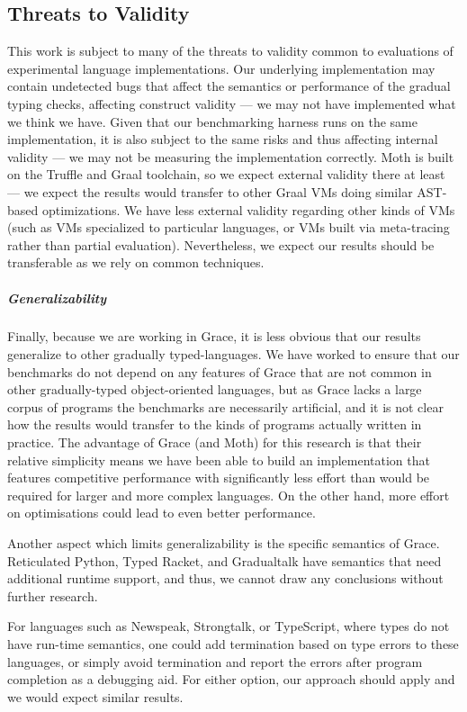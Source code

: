 \subsection{Threats to Validity}


This work is subject to many of the threats to validity common to
evaluations of experimental language implementations.  Our underlying
implementation may contain undetected bugs that affect the semantics
or performance of the gradual typing checks, affecting construct
validity --- we may not have implemented what we think we have. Given
that our benchmarking harness runs on the same implementation, it is also
subject to the same risks and thus affecting internal validity ---
we may not be measuring the implementation correctly.  Moth is built
on the Truffle and Graal toolchain, so we expect external validity
there at least --- we expect the results would transfer to other Graal
VMs doing similar AST-based optimizations.  We have less external
validity regarding other kinds of VMs (such as VMs specialized to 
particular languages, or VMs built via meta-tracing rather than partial evaluation). 
Nevertheless, we expect our results should be transferable
as we rely on common techniques.


\subparagraph{Generalizability}
Finally, because we are working in Grace, it is less obvious that our
results generalize to other gradually typed-languages. We have worked
to ensure that \eg our benchmarks do not depend on any features of Grace
that are not common in other gradually-typed object-oriented
languages, but as Grace lacks a large corpus of programs the
benchmarks are necessarily artificial, and it is not clear how the
results would transfer to the kinds of programs actually written in
practice. The advantage of Grace (and Moth) for this research is
that their relative simplicity means we have been able to build an
implementation that features competitive performance with significantly less
effort than would be required for larger and more complex languages.
On the other hand, more effort on optimisations could lead to
even better performance.

Another aspect which limits generalizability is the specific semantics of Grace.
Reticulated Python, Typed Racket, and Gradualtalk have semantics that need
additional runtime support, and thus, we cannot draw any conclusions without
further research.

For languages such as Newspeak, Strongtalk, or TypeScript,
where types do not have run-time semantics,
one could add termination based on type errors to these languages,
or simply avoid termination and report the errors after program completion
as a debugging aid.
For either option, our approach should apply and we would expect similar results.

